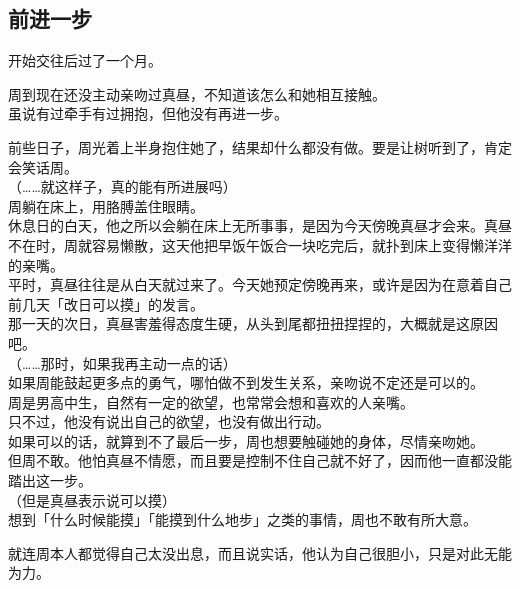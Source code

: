 \subsection{前进一步}

开始交往后过了一个月。

周到现在还没主动亲吻过真昼，不知道该怎么和她相互接触。\\

虽说有过牵手有过拥抱，但他没有再进一步。

前些日子，周光着上半身抱住她了，结果却什么都没有做。要是让树听到了，肯定会笑话周。\\

（……就这样子，真的能有所进展吗）\\

周躺在床上，用胳膊盖住眼睛。\\

休息日的白天，他之所以会躺在床上无所事事，是因为今天傍晚真昼才会来。真昼不在时，周就容易懒散，这天他把早饭午饭合一块吃完后，就扑到床上变得懒洋洋的亲嘴。\\

平时，真昼往往是从白天就过来了。今天她预定傍晚再来，或许是因为在意着自己前几天「改日可以摸」的发言。\\

那一天的次日，真昼害羞得态度生硬，从头到尾都扭扭捏捏的，大概就是这原因吧。\\

（……那时，如果我再主动一点的话）\\

如果周能鼓起更多点的勇气，哪怕做不到发生关系，亲吻说不定还是可以的。\\

周是男高中生，自然有一定的欲望，也常常会想和喜欢的人亲嘴。\\

只不过，他没有说出自己的欲望，也没有做出行动。\\

如果可以的话，就算到不了最后一步，周也想要触碰她的身体，尽情亲吻她。\\

但周不敢。他怕真昼不情愿，而且要是控制不住自己就不好了，因而他一直都没能踏出这一步。\\

（但是真昼表示说可以摸）\\

想到「什么时候能摸」「能摸到什么地步」之类的事情，周也不敢有所大意。

就连周本人都觉得自己太没出息，而且说实话，他认为自己很胆小，只是对此无能为力。\\

